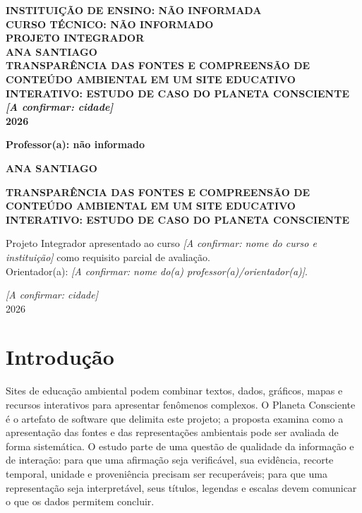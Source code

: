 \documentclass[12pt,oneside,a4paper,brazil]{abntex2}
\newcommand{\pendente}[1]{\textit{[A confirmar: #1]}}
\newcommand{\titulopesquisa}{Transparência das fontes e compreensão de conteúdo ambiental em um site educativo interativo: estudo de caso do Planeta Consciente}
\begin{document}
\begin{capa}
\begin{center}
\textbf{INSTITUIÇÃO DE ENSINO: NÃO INFORMADA}\\
\textbf{CURSO TÉCNICO: NÃO INFORMADO}\\[2cm]
\textbf{PROJETO INTEGRADOR}\\[3cm]
\textbf{\MakeUppercase{Ana Santiago}}\\[3cm]
\textbf{\MakeUppercase{\titulopesquisa}}\\[3cm]
\textbf{\pendente{cidade}}\\
\textbf{2026}
\end{center}
\vfill
\begin{center}\textbf{Professor(a): não informado}\end{center}
\end{capa}

\begin{folhaderosto}
\begin{center}\textbf{\MakeUppercase{Ana Santiago}}\end{center}
\vspace{3cm}
\begin{center}\textbf{\MakeUppercase{\titulopesquisa}}\end{center}
\vspace{2cm}
\hfill\begin{minipage}{0.52\textwidth}
Projeto Integrador apresentado ao curso \pendente{nome do curso e instituição} como requisito parcial de avaliação.\\[0.5cm]
Orientador(a): \pendente{nome do(a) professor(a)/orientador(a)}.
\end{minipage}
\vfill
\begin{center}\pendente{cidade}\\2026\end{center}
\end{folhaderosto}

\tableofcontents*
\textual
\chapter{Introdução}
Sites de educação ambiental podem combinar textos, dados, gráficos, mapas e recursos interativos para apresentar fenômenos complexos. O Planeta Consciente é o artefato de software que delimita este projeto; a proposta examina como a apresentação das fontes e das representações ambientais pode ser avaliada de forma sistemática. O estudo parte de uma questão de qualidade da informação e de interação: para que uma afirmação seja verificável, sua evidência, recorte temporal, unidade e proveniência precisam ser recuperáveis; para que uma representação seja interpretável, seus títulos, legendas e escalas devem comunicar o que os dados permitem concluir.
\end{document}
